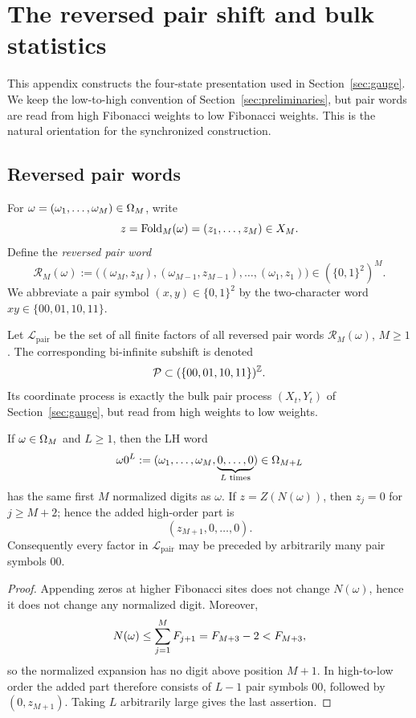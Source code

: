 \section{The reversed pair shift and bulk statistics}
\label{app:pressure}

This appendix constructs the four-state presentation used in Section~\ref{sec:gauge}. We keep the low-to-high convention of Section~\ref{sec:preliminaries}, but pair words are read from high Fibonacci weights to low Fibonacci weights. This is the natural orientation for the synchronized construction.

\subsection{Reversed pair words}
For \(\omega=(\omega_1,\dots,\omega_M)\in\Omega_M\), write
\[
z=\mathrm{Fold}_M(\omega)=(z_1,\dots,z_M)\in X_M.
\]
Define the \emph{reversed pair word}
\begin{equation}\label{eq:reversed-pair}
\mathcal{R}_M(\omega)
:=
\bigl((\omega_M,z_M),(\omega_{M-1},z_{M-1}),\dots,(\omega_1,z_1)\bigr)
\in (\{0,1\}^2)^M.
\end{equation}
We abbreviate a pair symbol \((x,y)\in\{0,1\}^2\) by the two-character word \(xy\in\{00,01,10,11\}\).

Let \(\mathcal{L}_{\mathrm{pair}}\) be the set of all finite factors of all reversed pair words \(\mathcal{R}_M(\omega)\), \(M\ge 1\). The corresponding bi-infinite subshift is denoted
\[
\mathcal{P}\subset (\{00,01,10,11\})^{\mathbb{Z}}.
\]
Its coordinate process is exactly the bulk pair process \((X_t,Y_t)\) of Section~\ref{sec:gauge}, but read from high weights to low weights.

\begin{lemma}\label{lem:zero-padding}
If \(\omega\in\Omega_M\) and \(L\ge 1\), then the LH word
\[
\omega 0^L:=(\omega_1,\dots,\omega_M,\underbrace{0,\dots,0}_{L\text{ times}})\in\Omega_{M+L}
\]
has the same first \(M\) normalized digits as \(\omega\). If \(z=Z(N(\omega))\), then \(z_j=0\) for \(j\ge M+2\); hence the added high-order part is
\[
(z_{M+1},0,\dots,0).
\]
Consequently every factor in \(\mathcal{L}_{\mathrm{pair}}\) may be preceded by arbitrarily many pair symbols \(00\).
\end{lemma}

\begin{proof}
Appending zeros at higher Fibonacci sites does not change \(N(\omega)\), hence it does not change any normalized digit. Moreover,
\[
N(\omega)\le \sum_{j=1}^MF_{j+1}=F_{M+3}-2<F_{M+3},
\]
so the normalized expansion has no digit above position \(M+1\). In high-to-low order the added part therefore consists of \(L-1\) pair symbols \(00\), followed by \((0,z_{M+1})\). Taking \(L\) arbitrarily large gives the last assertion.
\end{proof}

